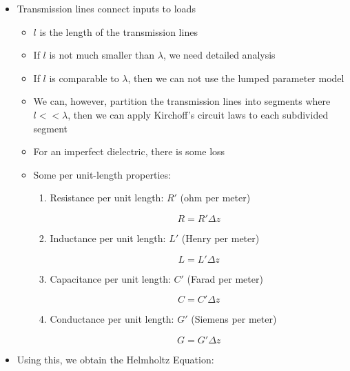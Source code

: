 \begin{itemize}

  \item Transmission lines connect inputs to loads

    \begin{itemize}

      \item $l$ is the length of the transmission lines

      \item If $l$ is not much smaller than $\lambda$, we need detailed analysis

      \item If $l$ is comparable to $\lambda$, then we can not use the lumped parameter model

      \item We can, however, partition the transmission lines into segments where $l<<\lambda$, then we can apply Kirchoff's circuit laws to each subdivided segment

      \item For an imperfect dielectric, there is some loss

      \item Some per unit-length properties:

        \begin{enumerate}

          \item Resistance per unit length: $R'$ (ohm per meter)

            $$\boxed{R=R'\Delta z}$$

          \item Inductance per unit length: $L'$ (Henry per meter)

            $$\boxed{L=L'\Delta z}$$

          \item Capacitance per unit length: $C'$ (Farad per meter)

            $$\boxed{C=C'\Delta z}$$

          \item Conductance per unit length: $G'$ (Siemens per meter)

            $$\boxed{G=G'\Delta z}$$

        \end{enumerate}

    \end{itemize}

  \item Using this, we obtain the Helmholtz Equation:


\end{itemize}
